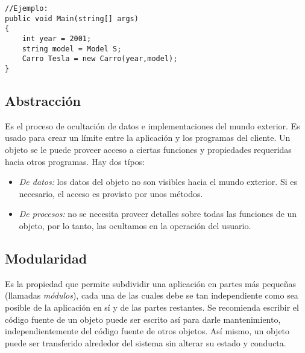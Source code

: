 \documentclass[letterpaper, 12pt]{article}
\begin{document}
\begin{justify}
\begin{verbatim}
//Ejemplo:
public void Main(string[] args)
{
    int year = 2001;
    string model = Model S;
    Carro Tesla = new Carro(year,model);
}
            \end{verbatim}
        \subsection{Abstracción}
        Es el proceso de ocultación de datos e implementaciones del mundo exterior. Es usado para crear un límite entre la aplicación y los programas del cliente.
        Un objeto se le puede proveer acceso a ciertas funciones y propiedades requeridas hacia otros programas. Hay dos típos:
        \begin{itemize}
            \item \emph{De datos:} los datos del objeto no son visibles hacia el mundo exterior. Si es necesario, el acceso es provisto por unos métodos.
            \item \emph{De procesos:} no se necesita proveer detalles sobre todas las funciones de un objeto, por lo tanto, las ocultamos en la operación del usuario.
        \end{itemize}
        \subsection{Modularidad}
        Es la propiedad que permite subdividir una aplicación en partes más pequeñas (llamadas \emph{módulos}), cada una de las cuales debe se tan independiente
        como sea posible de la aplicación en sí y de las partes restantes. Se recomienda escribir el código fuente de un objeto puede ser escrito así para darle
        mantenimiento, independientemente del código fuente de otros objetos. Así mismo, un objeto puede ser transferido alrededor del sistema sin alterar su estado y conducta.

\end{justify}
\end{document}
